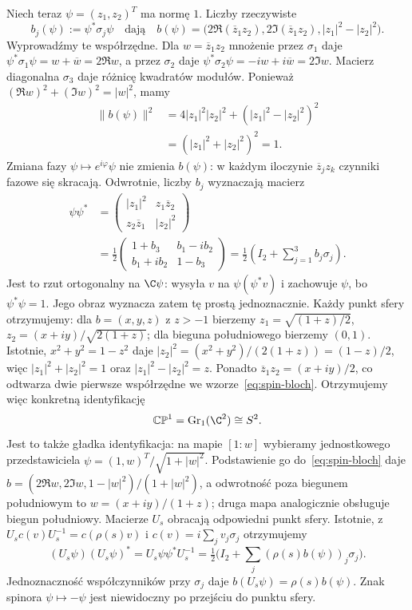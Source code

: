 \begin{przyklad}
Niech teraz $\psi=(z_1,z_2)^T$ ma normę $1$.
Liczby rzeczywiste
\begin{equation}\label{eq:spin-bloch}
 b_j(\psi):=\psi^*\sigma_j\psi
 \quad\text{dają}\quad
 b(\psi)=
 \bigl(2\Re(\overline z_1z_2),
       2\Im(\overline z_1z_2),
       |z_1|^2-|z_2|^2\bigr).
\end{equation}
Wyprowadźmy te współrzędne. Dla $w=\overline z_1z_2$
mnożenie przez $\sigma_1$ daje
$\psi^*\sigma_1\psi=w+\overline w=2\Re w$,
a przez $\sigma_2$ daje
$\psi^*\sigma_2\psi=-iw+i\overline w=2\Im w$.
Macierz diagonalna $\sigma_3$ daje różnicę kwadratów modułów.
Ponieważ $(\Re w)^2+(\Im w)^2=|w|^2$, mamy
\[
 \begin{aligned}
 \|b(\psi)\|^2
 &=4|z_1|^2|z_2|^2+(|z_1|^2-|z_2|^2)^2\\
 &=(|z_1|^2+|z_2|^2)^2=1.
 \end{aligned}
\]
Zmiana fazy $\psi\mapsto e^{i\varphi}\psi$
nie zmienia $b(\psi)$: w każdym iloczynie
$\overline z_jz_k$ czynniki fazowe się skracają.
Odwrotnie, liczby $b_j$ wyznaczają macierz
\[
 \begin{aligned}
 \psi\psi^*
 &=\begin{pmatrix}
 |z_1|^2&z_1\overline z_2\\
 z_2\overline z_1&|z_2|^2
 \end{pmatrix}\\
 &=\frac12\begin{pmatrix}
 1+b_3&b_1-ib_2\\b_1+ib_2&1-b_3
 \end{pmatrix}
 =\frac12\left(I_2+\sum_{j=1}^3b_j\sigma_j\right).
 \end{aligned}
\]
Jest to rzut ortogonalny na $\C\psi$: wysyła $v$ na
$\psi(\psi^*v)$ i zachowuje $\psi$, bo $\psi^*\psi=1$.
Jego obraz wyznacza zatem tę prostą jednoznacznie.
Każdy punkt sfery otrzymujemy: dla
$b=(x,y,z)$ z $z>-1$ bierzemy
$z_1=\sqrt{(1+z)/2}$,
$z_2=(x+iy)/\sqrt{2(1+z)}$;
dla bieguna południowego bierzemy $(0,1)$.
Istotnie, $x^2+y^2=1-z^2$ daje
$|z_2|^2=(x^2+y^2)/(2(1+z))=(1-z)/2$,
więc $|z_1|^2+|z_2|^2=1$ oraz $|z_1|^2-|z_2|^2=z$.
Ponadto $\overline z_1z_2=(x+iy)/2$,
co odtwarza dwie pierwsze współrzędne we wzorze~\eqref{eq:spin-bloch}.
Otrzymujemy więc konkretną identyfikację
\[
 \mathbb{CP}^1=\operatorname{Gr}_1(\C^2)\cong S^2.
\]
Jest to także gładka identyfikacja: na mapie $[1:w]$
wybieramy jednostkowego przedstawiciela
$\psi=(1,w)^T/\sqrt{1+|w|^2}$.
Podstawienie go do~\eqref{eq:spin-bloch} daje
$b=(2\Re w,2\Im w,1-|w|^2)/(1+|w|^2)$,
a odwrotność poza biegunem południowym to $w=(x+iy)/(1+z)$;
druga mapa analogicznie obsługuje biegun południowy.
Macierze $U_s$ obracają odpowiedni punkt sfery.
Istotnie, z $U_sc(v)U_s^{-1}=c(\rho(s)v)$ i $c(v)=i\sum_jv_j\sigma_j$
otrzymujemy
\[
 (U_s\psi)(U_s\psi)^*
 =U_s\psi\psi^*U_s^{-1}
 =\tfrac12\bigl(I_2+\textstyle\sum_j(\rho(s)b(\psi))_j\sigma_j\bigr).
\]
Jednoznaczność współczynników przy $\sigma_j$ daje
$b(U_s\psi)=\rho(s)b(\psi)$.
Znak spinora $\psi\mapsto-\psi$ jest
niewidoczny po przejściu do punktu sfery.
\end{przyklad}


